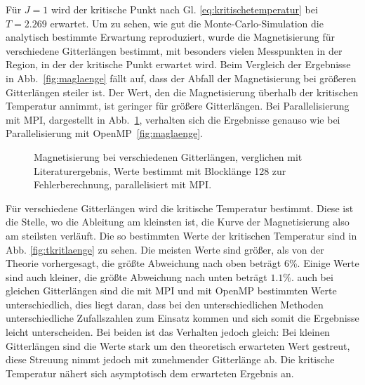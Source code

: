 	
	Für $J=1$ wird der kritische Punkt nach Gl. \ref{eq:kritischetemperatur} bei $T=\num{2,269}$ erwartet.
	Um zu sehen, wie gut die Monte-Carlo-Simulation die analytisch bestimmte Erwartung reproduziert, wurde die Magnetisierung für verschiedene Gitterlängen bestimmt, mit besonders vielen Messpunkten in der Region, in der der kritische Punkt erwartet wird. Beim Vergleich der Ergebnisse in Abb.~\ref{fig:maglaenge} fällt auf, dass der Abfall der Magnetisierung bei größeren Gitterlängen steiler ist. Der Wert, den die Magnetisierung überhalb der kritischen Temperatur annimmt, ist geringer für größere Gitterlängen. Bei Parallelisierung mit MPI, dargestellt in Abb.~\ref{fig:maglaengempi}, verhalten sich die Ergebnisse genauso wie bei Parallelisierung mit OpenMP~\ref{fig:maglaenge}.
	
	
	\begin{figure}[htbp]
		
		\caption[Magnetisierung bei verschiedenen Gitterlängen und Verwendung von MPI]{Magnetisierung bei verschiedenen Gitterlängen, verglichen mit Literaturergebnis, Werte bestimmt mit Blocklänge 128 zur Fehlerberechnung, parallelisiert mit MPI.}
		\label{fig:maglaengempi}
	\end{figure}

	Für verschiedene Gitterlängen wird die kritische Temperatur bestimmt. Diese ist die Stelle, wo die Ableitung am kleinsten ist, die Kurve der Magnetisierung also am steilsten verläuft. Die so bestimmten Werte der kritischen Temperatur sind in Abb. \ref{fig:tkritlaenge} zu sehen. Die meisten Werte sind größer, als von der Theorie vorhergesagt, die größte Abweichung nach oben beträgt 6\%. Einige Werte sind auch kleiner, die größte Abweichung nach unten beträgt $\num{1,1}\%$. auch bei gleichen Gitterlängen sind die mit MPI und mit OpenMP bestimmten Werte unterschiedlich, dies liegt daran, dass bei den unterschiedlichen Methoden unterschiedliche Zufallszahlen zum Einsatz kommen und sich somit die Ergebnisse leicht unterscheiden. Bei beiden ist das Verhalten jedoch gleich: Bei kleinen Gitterlängen sind die Werte stark um den theoretisch erwarteten Wert gestreut, diese Streuung nimmt jedoch mit zunehmender Gitterlänge ab. Die kritische Temperatur nähert sich asymptotisch dem erwarteten Ergebnis an.
	
